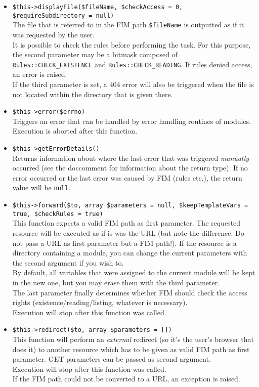 \documentclass{scrartcl}
\begin{document}
\begin{itemize}
         \item \lstinline!$this->displayFile($fileName, $checkAccess = 0, $requireSubdirectory = null)! \\
            The file that is referred to in the FIM path \lstinline!$fileName! is outputted as if it was requested by the user. \\
            It is possible to check the rules before performing the task. For this purpose, the second parameter may be a bitmask composed of \lstinline!Rules::CHECK_EXISTENCE! and \lstinline!Rules::CHECK_READING!. If rules denied access, an error is raised. \\
            If the third parameter is set, a 404 error will also be triggered when the file is not located within the directory that is given there.
         \item \lstinline!$this->error($errno)! \\
            Triggers an error that can be handled by error handling routines of modules. Execution is aborted after this function.
         \item \lstinline!$this->getErrorDetails()! \\
            Returns information about where the last error that was triggered \emph{manually} occurred (see the doccomment for information about the return type). If no error occurred or the last error was caused by FIM (rules etc.), the return value will be \lstinline!null!.
         \item \lstinline!$this->forward($to, array $parameters = null, $keepTemplateVars = true, $checkRules = true)! \\
            This function expects a valid FIM path as first parameter. The requested resource will be executed as if is was the URL (but note the difference: Do not pass a URL as first parameter but a FIM path!). If the resource is a directory containing a module, you can change the current parameters with the second argument if you wish to. \\
            By default, all variables that were assigned to the current module will be kept in the new one, but you may erase them with the third parameter. \\
            The last parameter finally determines whether FIM should check the access rights (existence/reading/listing, whatever is necessary). \\
            Execution will stop after this function was called.
         \item \lstinline!$this->redirect($to, array $parameters = [])! \\
            This function will perform an \emph{external} redirect (so it's the user's browser that does it) to another resource which has to be given as valid FIM path as first parameter. GET parameters can be passed as second argument. \\
            Execution will stop after this function was called. \\
            If the FIM path could not be converted to a URL, an exception is raised.
      \end{itemize}
\end{document}
